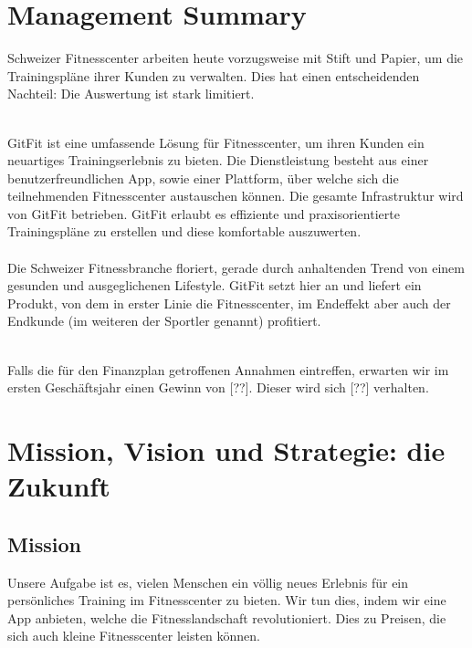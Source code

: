 

\newcommand{\SUBJECT}{Businessplan}
\newcommand{\TITLE}{GitFit}






\section{Management Summary}
\setcounter{page}{1}
Schweizer Fitnesscenter arbeiten heute vorzugsweise mit Stift und Papier, um die Trainingspläne ihrer Kunden zu verwalten. Dies hat einen entscheidenden Nachteil: Die Auswertung ist stark limitiert.

\hfill \\
GitFit ist eine umfassende Lösung für Fitnesscenter, um ihren Kunden ein neuartiges Trainingserlebnis zu bieten. Die Dienstleistung besteht aus einer benutzerfreundlichen App, sowie einer Plattform, über welche sich die teilnehmenden Fitnesscenter austauschen können. Die gesamte Infrastruktur wird von GitFit betrieben. GitFit erlaubt es effiziente und praxisorientierte Trainingspläne zu erstellen und diese komfortable auszuwerten.  
\hfill \\ \\
Die Schweizer Fitnessbranche floriert, gerade durch anhaltenden Trend von einem gesunden und ausgeglichenen Lifestyle. GitFit setzt hier an und liefert ein Produkt, von dem in erster Linie die Fitnesscenter, im Endeffekt aber auch der Endkunde (im weiteren der Sportler genannt) profitiert.  

\hfill \\
Falls die für den Finanzplan getroffenen Annahmen eintreffen, erwarten wir im ersten Geschäftsjahr einen Gewinn von [??]. Dieser wird sich [??] verhalten.




\section{Mission, Vision und Strategie: die Zukunft}
\subsection{Mission}
Unsere Aufgabe ist es, vielen Menschen ein völlig neues Erlebnis für ein persönliches Training im Fitnesscenter zu bieten. Wir tun dies, indem wir eine App anbieten, welche die Fitnesslandschaft revolutioniert. Dies zu Preisen, die sich auch kleine Fitnesscenter leisten können.

